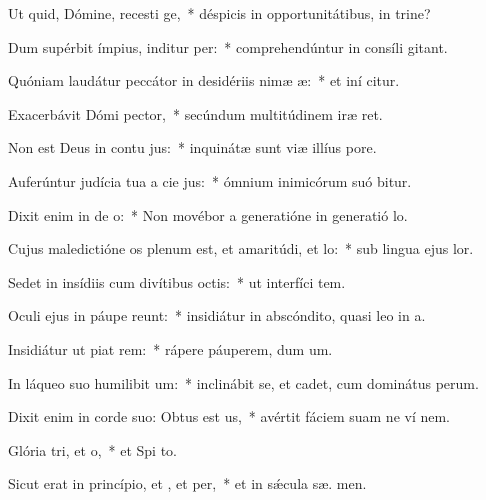 \item Ut quid, Dómine, recesti ge,~* déspicis in opportunitátibus, in trine?
\item Dum supérbit ímpius, inditur per:~* comprehendúntur in consíli  gitant.
\item Quóniam laudátur peccátor in desidériis nimæ æ:~* et iní citur.
\item Exacerbávit Dómi pector,~* secúndum multitúdinem iræ   ret.
\item Non est Deus in contu jus:~* inquinátæ sunt viæ illíus   pore.
\item Auferúntur judícia tua a cie jus:~* ómnium inimicórum suó bitur.
\item Dixit enim in de o:~* Non movébor a generatióne in generatió  lo.
\item Cujus maledictióne os plenum est, et amaritúdi, et lo:~* sub lingua ejus   lor.
\item Sedet in insídiis cum divítibus  octis:~* ut interfíci tem.
\item Oculi ejus in páupe reunt:~* insidiátur in abscóndito, quasi leo in  a.
\item Insidiátur ut piat rem:~* rápere páuperem, dum  um.
\item In láqueo suo humilibit um:~* inclinábit se, et cadet, cum dominátus  perum.
\item Dixit enim in corde suo: Obtus est us,~* avértit fáciem suam ne ví  nem.
\item Glória tri, et o,~* et Spi to.
\item Sicut erat in princípio, et , et per,~* et in sǽcula sæ. men.
